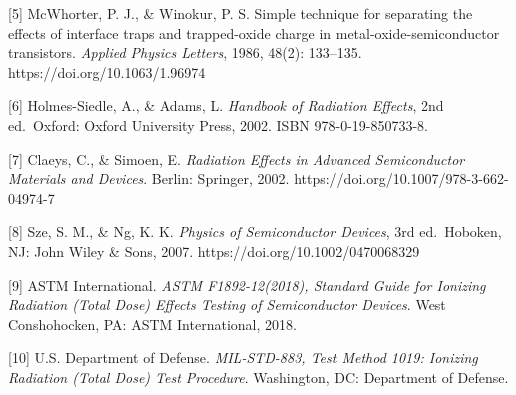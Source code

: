 \documentclass[UTF8,a4paper,12pt]{ctexart}
\begin{document}
{[}5{]} McWhorter, P. J., \& Winokur, P. S. Simple technique for
separating the effects of interface traps and trapped-oxide charge in
metal-oxide-semiconductor transistors. \emph{Applied Physics Letters},
1986, 48(2): 133--135. https://doi.org/10.1063/1.96974

{[}6{]} Holmes-Siedle, A., \& Adams, L. \emph{Handbook of Radiation
Effects}, 2nd ed.~Oxford: Oxford University Press, 2002. ISBN
978-0-19-850733-8.

{[}7{]} Claeys, C., \& Simoen, E. \emph{Radiation Effects in Advanced
Semiconductor Materials and Devices}. Berlin: Springer, 2002.
https://doi.org/10.1007/978-3-662-04974-7

{[}8{]} Sze, S. M., \& Ng, K. K. \emph{Physics of Semiconductor
Devices}, 3rd ed.~Hoboken, NJ: John Wiley \& Sons, 2007.
https://doi.org/10.1002/0470068329

{[}9{]} ASTM International. \emph{ASTM F1892-12(2018), Standard Guide
for Ionizing Radiation (Total Dose) Effects Testing of Semiconductor
Devices}. West Conshohocken, PA: ASTM International, 2018.

{[}10{]} U.S. Department of Defense. \emph{MIL-STD-883, Test Method
1019: Ionizing Radiation (Total Dose) Test Procedure}. Washington, DC:
Department of Defense.
\end{document}
